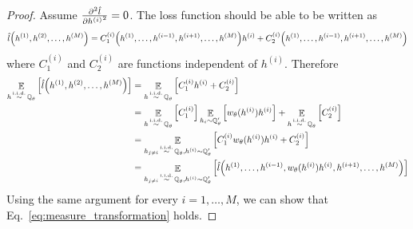 \documentclass{article}
\theoremstyle{plain}
\theoremstyle{definition}
\theoremstyle{remark}
\DeclareMathOperator{\Q}{\mathbb{Q}}
\DeclareMathOperator{\E}{\mathbb{E}}
\DeclareMathOperator{\iid}{\overset{\mathrm{i.i.d.}}{\sim}}
\begin{document}
\begin{proof}
    Assume $\pdv[2]{\hat{l}}{{h^{(i)}}} = 0$. The loss function should be able to be written as
    \begin{equation}
        \hat{l}\qty(h^{(1)}, h^{(2)}, \dots, h^{(M)}) = C_1^{(i)}\qty(h^{(1)}, \dots, h^{(i-1)}, h^{(i+1)}, \dots, h^{(M)}) h^{(i)} + C_2^{(i)}\qty(h^{(1)}, \dots, h^{(i-1)}, h^{(i+1)}, \dots, h^{(M)})
    \end{equation}
    where $C_1^{(i)}$ and $C_2^{(i)}$ are functions independent of $h^{(i)}$. Therefore
    \begin{equation}
        \begin{aligned}
            \E_{h\iid \Q_\theta}\qty[\hat{l}\qty(h^{(1)}, h^{(2)}, \dots, h^{(M)})] & = \E_{h\iid \Q_\theta}\qty[C_1^{(i)}h^{(i)} + C_2^{(i)}] \\
            & = \E_{h\iid \Q_\theta}\qty[C_1^{(i)}] \E_{h_i \sim \Q_\theta'}\qty[w_\theta(h^{(i)})h^{(i)}] + \E_{h\iid \Q_\theta}\qty[C_2^{(i)}] \\
            & = \E_{h_{j\neq i}\iid \Q_\theta, h^{(i)}\sim \Q_\theta'}\qty[C_1^{(i)}w_\theta(h^{(i)})h^{(i)} + C_2^{(i)}] \\
            & = \E_{h_{j\neq i}\iid \Q_\theta, h^{(i)}\sim \Q_\theta'}\qty[\hat{l}\qty(h^{(1)},\dots, h^{(i-1)}, w_\theta(h^{(i)})h^{(i)}, h^{(i+1)}, \dots, h^{(M)})] \\
        \end{aligned}
    \end{equation}
    Using the same argument for every $i=1,\dots,M$, we can show that Eq.~\eqref{eq:measure_transformation} holds.
\end{proof}
\end{document}
